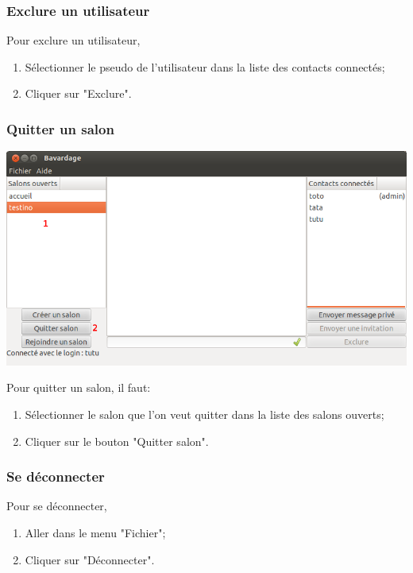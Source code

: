 \documentclass[a4paper,11pt,french]{book}
\begin{document}
\subsubsection{Exclure un utilisateur}
Pour exclure un utilisateur,
\begin{enumerate}
    \item Sélectionner le pseudo de l'utilisateur dans la liste des contacts connectés;
    \item Cliquer sur "Exclure".
\end{enumerate}
\newpage

\subsubsection{Quitter un salon}

\includegraphics[width=40em]{capture/quit_room.png}

Pour quitter un salon, il faut:

\begin{enumerate}
    \item Sélectionner le salon que l'on veut quitter dans la liste des salons ouverts;
    \item Cliquer sur le bouton "Quitter salon".

\end{enumerate}

\subsubsection{Se déconnecter}
Pour se déconnecter,
\begin{enumerate}
    \item Aller dans le menu "Fichier";
    \item Cliquer sur "Déconnecter".
\end{enumerate}
\end{document}
